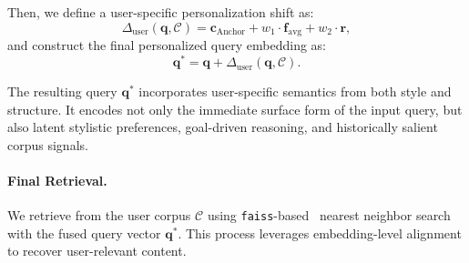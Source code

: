 Then, we define a user-specific personalization shift as:
\begin{equation}
\Delta_\text{user}(\mathbf{q}, \mathcal{C}) = \mathbf{c}_{\text{Anchor}} + w_1 \cdot \mathbf{f}_{\text{avg}} + w_2 \cdot \mathbf{r},
\end{equation}
and construct the final personalized query embedding as:
\begin{equation}
\mathbf{q}^* = \mathbf{q} + \Delta_\text{user}(\mathbf{q}, \mathcal{C}).
\end{equation}

The resulting query $\mathbf{q}^*$ incorporates user-specific semantics from both style and structure. It encodes not only the immediate surface form of the input query, but also latent stylistic preferences, goal-driven reasoning, and historically salient corpus signals.


\paragraph{Final Retrieval.}  
We retrieve from the user corpus $\mathcal{C}$ using \texttt{faiss}-based~\cite{douze2024faiss} nearest neighbor search with the fused query vector $\mathbf{q}^*$. This process leverages embedding-level alignment to recover user-relevant content.

